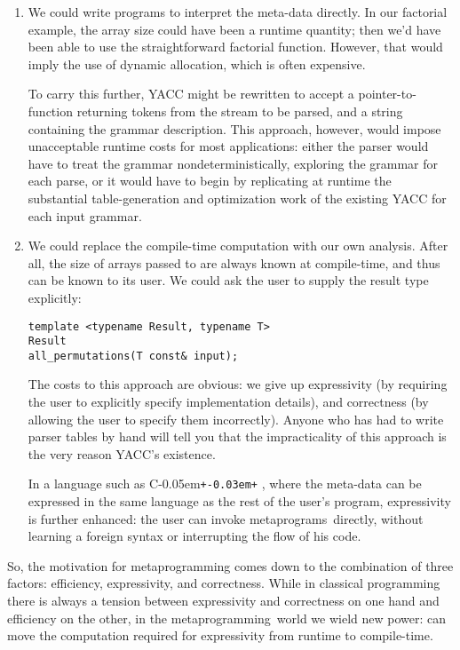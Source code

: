 \documentclass{netobjectdays}
\newcommand{\Cpp}{C\kern-0.05em\texttt{+\kern-0.03em+}%
}
\newcommand{\mping}{meta\-program\-ming}
\newcommand{\mpgms}{meta\-programs}
\begin{document}
\begin{enumerate}

\item We could write programs to interpret the meta-data directly. In
  our factorial example, the array size could have been a runtime
  quantity; then we'd have been able to use the straightforward
  factorial function. However, that would imply the use of dynamic
  allocation, which is often expensive.

  To carry this further, YACC might be rewritten to accept a
  pointer-to-function returning tokens from the stream to be parsed,
  and a string containing the grammar description. This approach,
  however, would impose unacceptable runtime costs for most
  applications: either the parser would have to treat the grammar
  nondeterministically, exploring the grammar for each parse, or it
  would have to begin by replicating at runtime the substantial
  table-generation and optimization work of the existing YACC for each
  input grammar.

\item We could replace the compile-time computation with our own
  analysis. After all, the size of arrays passed to
   are always known at compile-time, and
  thus can be known to its user. We could ask the user to supply the
  result type explicitly: {\footnotesize
  \begin{verbatim}
template <typename Result, typename T>
Result
all_permutations(T const& input);
  \end{verbatim}
  }
  The costs to this approach are obvious: we give up expressivity (by
  requiring the user to explicitly specify implementation details),
  and correctness (by allowing the user to specify them
  incorrectly). Anyone who has had to write parser tables by hand will
  tell you that the impracticality of this approach is the very reason
  YACC's existence.

  In a language such as \Cpp, where the meta-data can be expressed in
  the same language as the rest of the user's program, expressivity is
  further enhanced: the user can invoke \mpgms\ directly, without
  learning a foreign syntax or interrupting the flow of his code.
\end{enumerate}

So, the motivation for \mping{} comes down to the combination of three
factors: efficiency, expressivity, and correctness. While in classical
programming there is always a tension between expressivity and
correctness on one hand and efficiency on the other, in the \mping\
world we wield new power: can move the computation required for
expressivity from runtime to compile-time.
\end{document}
